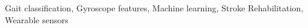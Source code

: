 \documentclass{ieeeaccess}
\begin{document}
\begin{keywords}
Gait classification, Gyroscope features, Machine learning, Stroke Rehabilitation, Wearable sensors
\end{keywords}

\titlepgskip=-15pt

\maketitle




\newpage






\EOD
\end{document}
